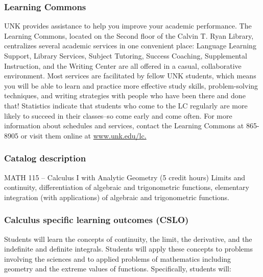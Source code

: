 \documentclass[12pt]{article}
\newcounter{ex}\setcounter{ex}{0}
\begin{document}
\subsubsection*{Learning Commons}
UNK provides assistance to help you improve your academic performance. The Learning Commons, located on the Second floor of the Calvin T. Ryan Library, centralizes several academic
services in one convenient place: Language Learning Support, Library Services, Subject Tutoring, Success Coaching, Supplemental Instruction, and the Writing Center are all
offered in a casual, collaborative environment.  Most services are facilitated by fellow UNK students, which means you will be able to learn and practice more effective
study skills, problem-solving techniques, and writing strategies with people who have been there and done that!  Statistics indicate that students who come to the LC
regularly are more likely to succeed in their classes--so come early and come often. For more information about schedules and services, contact the Learning Commons at
865-8905 or visit them online at \url{www.unk.edu/lc.}

\subsubsection*{Catalog description}

MATH 115 – Calculus I with Analytic Geometry (5 credit hours) Limits and continuity, differentiation of algebraic and trigonometric functions, elementary integration (with applications) of algebraic and trigonometric functions.

\subsubsection*{Calculus specific learning outcomes (CSLO)}

	Students will learn the concepts of continuity, the limit, the derivative, and the indefinite and definite integrals. Students will apply these concepts to problems involving the sciences and to applied problems of mathematics including geometry and the extreme values of functions. Specifically, students will:
\end{document}
